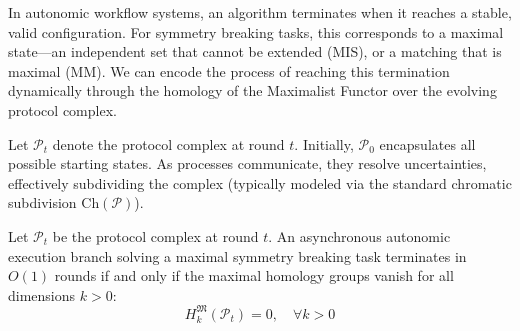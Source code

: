 In autonomic workflow systems, an algorithm terminates when it reaches a stable, valid configuration. For symmetry breaking tasks, this corresponds to a maximal state---an independent set that cannot be extended (MIS), or a matching that is maximal (MM). We can encode the process of reaching this termination dynamically through the homology of the Maximalist Functor over the evolving protocol complex.

Let $\mathcal{P}_t$ denote the protocol complex at round $t$. Initially, $\mathcal{P}_0$ encapsulates all possible starting states. As processes communicate, they resolve uncertainties, effectively subdividing the complex (typically modeled via the standard chromatic subdivision $\text{Ch}(\mathcal{P})$).

\begin{theorem}
\label{thm:maximal_homology}
Let $\mathcal{P}_t$ be the protocol complex at round $t$. An asynchronous autonomic execution branch solving a maximal symmetry breaking task terminates in $O(1)$ rounds if and only if the maximal homology groups vanish for all dimensions $k > 0$:
\[
H_k^{\mathfrak{M}}(\mathcal{P}_t) = 0, \quad \forall k > 0
\]
\end{theorem}

